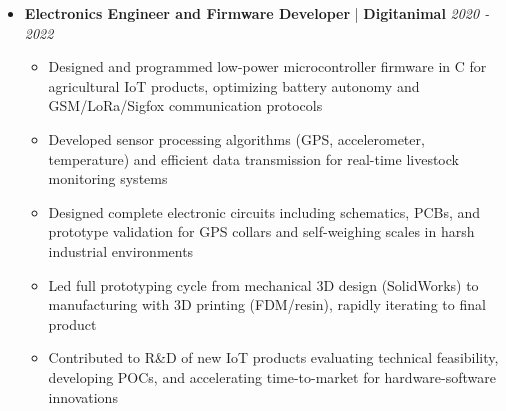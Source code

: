\documentclass[11pt]{article}
\begin{document}
\begin{itemize}[leftmargin=0em, itemsep=0.4em, parsep=0em]
\begin{itemize}[leftmargin=1.2em, itemsep=0.05em, parsep=0em, topsep=0.15em]
    \item Designed scalable and modular software architectures following SOLID principles and design patterns, facilitating code maintainability and extensibility
  
    \item Built data preprocessing pipelines with NumPy and Pandas to feed ML models, optimizing performance and prediction quality
  
  \end{itemize}

  \item[] \textbf{\large Electronics Engineer and Firmware Developer } | \textbf{ Digitanimal } \hfill \textit{ 2020 - 2022 }

  \begin{itemize}[leftmargin=1.2em, itemsep=0.05em, parsep=0em, topsep=0.15em]
  
    \item Designed and programmed low-power microcontroller firmware in C for agricultural IoT products, optimizing battery autonomy and GSM/LoRa/Sigfox communication protocols
  
    \item Developed sensor processing algorithms (GPS, accelerometer, temperature) and efficient data transmission for real-time livestock monitoring systems
  
    \item Designed complete electronic circuits including schematics, PCBs, and prototype validation for GPS collars and self-weighing scales in harsh industrial environments
  
    \item Led full prototyping cycle from mechanical 3D design (SolidWorks) to manufacturing with 3D printing (FDM/resin), rapidly iterating to final product
  
    \item Contributed to R\&D of new IoT products evaluating technical feasibility, developing POCs, and accelerating time-to-market for hardware-software innovations
  
  \end{itemize}

\end{itemize}

\vspace{0.05cm}

\end{document}
